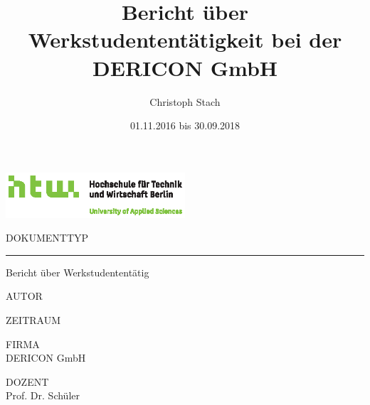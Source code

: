 \documentclass[chapterprefix=false, 12pt, a4paper, oneside, parskip=half, listof=totoc, bibliography=totoc, numbers=noendperiod]{scrbook}
\title{Bericht über Werkstudententätigkeit bei der DERICON GmbH}
\author{Christoph Stach}
\date{01.11.2016 bis 30.09.2018}
\begin{document}
    \begin{titlepage}
        \includegraphics[width=0.50\textwidth]{img/Q01_HTW_Berlin_Logo_quer_pos_FARBIG_CMYK.eps}

        \vspace{4.0cm}

        \begin{changemargin}{0.5cm}{0.0cm}
            \color{htwgrau}
            \normalsize
            \textsf{\noindent\MakeUppercase{Dokumenttyp}} \vspace{-20pt}\\
            \noindent\rule{\textwidth}{0.5pt}\vspace{-4pt}
            \color{black}
            \huge
            \textsf{Bericht über Werkstudententätig}
            \vspace{12pt}

            \color{htwgrau}
            \normalsize
            \textsf{\MakeUppercase{Autor}}\\
            \color{black}
            \large
            \textsf{\theauthor}

            \color{htwgrau}
            \normalsize
            \textsf{\MakeUppercase{Zeitraum}}\\
            \color{black}
            \large
            \textsf{\thedate}

            \vfill

            \color{htwgrau}
            \normalsize
            \textsf{\MakeUppercase{Firma}}\\
            \color{black}
            \large
            \textsf{DERICON GmbH}

            \color{htwgrau}
            \normalsize
            \textsf{\MakeUppercase{Dozent}}\\
            \color{black}
            \large
            \textsf{Prof. Dr. Schüler}
            \vspace{-60pt}
        \end{changemargin}
    \end{titlepage}
\end{document}
